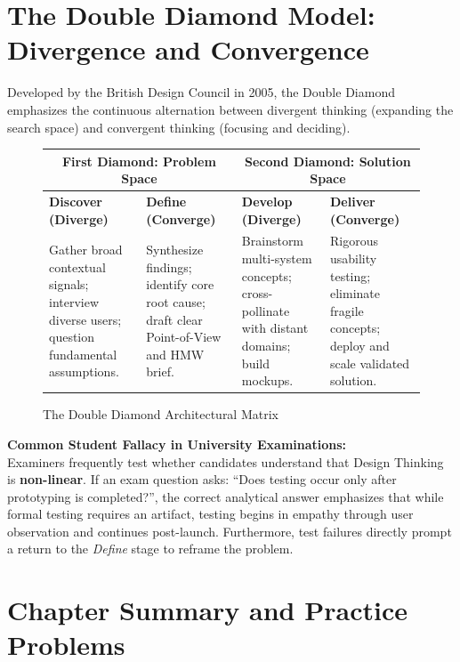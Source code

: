 \section{The Double Diamond Model: Divergence and Convergence}
Developed by the British Design Council in 2005, the Double Diamond emphasizes the continuous alternation between divergent thinking (expanding the search space) and convergent thinking (focusing and deciding).

\begin{figure}[htbp]
\centering
\begin{tabularx}{\linewidth}{|X|X||X|X|} \hline
\multicolumn{2}{|c||}{\textbf{First Diamond: Problem Space}} & \multicolumn{2}{c|}{\textbf{Second Diamond: Solution Space}} \\ \hline
\textbf{Discover (Diverge)} & \textbf{Define (Converge)} & \textbf{Develop (Diverge)} & \textbf{Deliver (Converge)} \\ \hline
Gather broad contextual signals; interview diverse users; question fundamental assumptions. & Synthesize findings; identify core root cause; draft clear Point-of-View and HMW brief. & Brainstorm multi-system concepts; cross-pollinate with distant domains; build mockups. & Rigorous usability testing; eliminate fragile concepts; deploy and scale validated solution. \\ \hline
\end{tabularx}
\caption{The Double Diamond Architectural Matrix}
\end{figure}

\begin{examtip}
\textbf{Common Student Fallacy in University Examinations:}\\
Examiners frequently test whether candidates understand that Design Thinking is \textbf{non-linear}. If an exam question asks: ``Does testing occur only after prototyping is completed?'', the correct analytical answer emphasizes that while formal testing requires an artifact, testing begins in empathy through user observation and continues post-launch. Furthermore, test failures directly prompt a return to the \textit{Define} stage to reframe the problem.
\end{examtip}

\section{Chapter Summary and Practice Problems}

